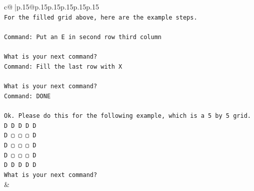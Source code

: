 \documentclass{article}
\begin{document}
{\begin{supertabular}{c@{$\;$}|p{.15\linewidth}@{}p{.15\linewidth}p{.15\linewidth}p{.15\linewidth}p{.15\linewidth}p{.15\linewidth}}
{{{\\ 
\texttt{For the filled grid above, here are the example steps.} \\
\\ 
\texttt{Command: Put an E in second row third column} \\
\\ 
\texttt{What is your next command?} \\
\texttt{Command: Fill the last row with X} \\
\\ 
\texttt{What is your next command?} \\
\texttt{Command: DONE} \\
\\ 
\texttt{Ok. Please do this for the following example, which is a 5 by 5 grid.} \\
\texttt{D D D D D} \\
\texttt{D ▢ ▢ ▢ D} \\
\texttt{D ▢ ▢ ▢ D} \\
\texttt{D ▢ ▢ ▢ D} \\
\texttt{D D D D D} \\
\texttt{What is your next command?} \\
            }
        }
    }
    & \\ \\


\end{supertabular}}
\end{document}
